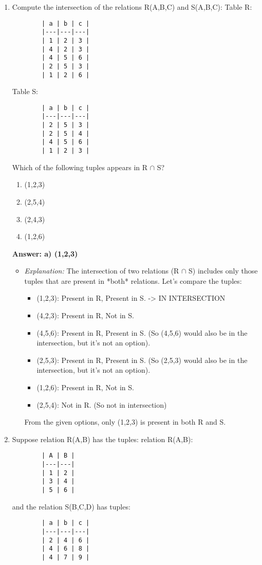 \documentclass{article}
\begin{document}
\begin{enumerate}[label=\textbf{Question \arabic*.}]
    \item Compute the intersection of the relations R(A,B,C) and S(A,B,C):
        Table R:
        \begin{verbatim}
        | a | b | c |
        |---|---|---|
        | 1 | 2 | 3 |
        | 4 | 2 | 3 |
        | 4 | 5 | 6 |
        | 2 | 5 | 3 |
        | 1 | 2 | 6 |
        \end{verbatim}
        Table S:
        \begin{verbatim}
        | a | b | c |
        |---|---|---|
        | 2 | 5 | 3 |
        | 2 | 5 | 4 |
        | 4 | 5 | 6 |
        | 1 | 2 | 3 |
        \end{verbatim}
        Which of the following tuples appears in R $\cap$ S?
        \begin{enumerate}[label=\alph*)]
            \item (1,2,3)
            \item (2,5,4)
            \item (2,4,3)
            \item (1,2,6)
        \end{enumerate}
        \textbf{Answer: a) (1,2,3)}
        \begin{itemize}
            \item \textit{Explanation:} The intersection of two relations (R $\cap$ S) includes only those tuples that are present in *both* relations.
            Let's compare the tuples:
            \begin{itemize}
                \item (1,2,3): Present in R, Present in S. -> IN INTERSECTION
                \item (4,2,3): Present in R, Not in S.
                \item (4,5,6): Present in R, Present in S. (So (4,5,6) would also be in the intersection, but it's not an option).
                \item (2,5,3): Present in R, Present in S. (So (2,5,3) would also be in the intersection, but it's not an option).
                \item (1,2,6): Present in R, Not in S.
                \item (2,5,4): Not in R. (So not in intersection)
            \end{itemize}
            From the given options, only (1,2,3) is present in both R and S.
        \end{itemize}
    
    \item Suppose relation R(A,B) has the tuples:
        relation R(A,B):
        \begin{verbatim}
        | A | B |
        |---|---|
        | 1 | 2 |
        | 3 | 4 |
        | 5 | 6 |
        \end{verbatim}
        and the relation S(B,C,D) has tuples:
        \begin{verbatim}
        | a | b | c |
        |---|---|---|
        | 2 | 4 | 6 |
        | 4 | 6 | 8 |
        | 4 | 7 | 9 |
        \end{verbatim}
        

\end{enumerate}
\end{document}
